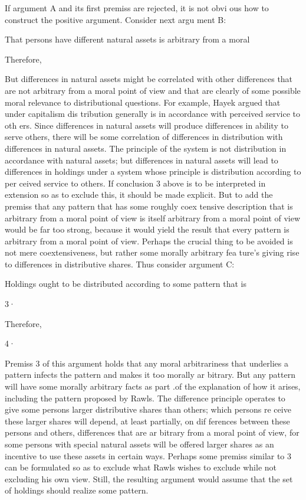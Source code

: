 \documentclass[11pt,openany]{book}
\begin{document}
If argument A and its first premiss are rejected, it is not obvi ous how to construct the positive argument. Consider next argu ment B: 

That persons have different natural assets is arbitrary from a moral 

Therefore, 

But differences in natural assets might be correlated with other differences that are not arbitrary from a moral point of view and that are clearly of some possible moral relevance to distributional questions. For example, Hayek argued that under capitalism dis tribution generally is in accordance with perceived service to oth ers. Since differences in natural assets will produce differences in ability to serve others, there will be some correlation of differences in distribution with differences in natural assets. The principle of the system is not distribution in accordance with natural assets; but differences in natural assets will lead to differences in holdings under a system whose principle is distribution according to per ceived service to others. If conclusion 3 above is to be interpreted in extension so as to exclude this, it should be made explicit. But to add the premiss that any pattern that has some roughly coex tensive description that is arbitrary from a moral point of view is itself arbitrary from a moral point of view would be far too strong, because it would yield the result that every pattern is arbitrary from a moral point of view. Perhaps the crucial thing to be avoided is not mere coextensiveness, but rather some morally arbitrary fea ture's giving rise to differences in distributive shares. Thus consider argument C: 

Holdings ought to be distributed according to some pattern that is 

3· 

Therefore, 

4· 

Premiss 3 of this argument holds that any moral arbitrariness that underlies a pattern infects the pattern and makes it too morally ar bitrary. But any pattern will have some morally arbitrary facts as part .of the explanation of how it arises, including the pattern proposed by Rawls. The difference principle operates to give some persons larger distributive shares than others; which persons re ceive these larger shares will depend, at least partially, on dif ferences between these persons and others, differences that are ar bitrary from a moral point of view, for some persons with special natural assets will be offered larger shares as an incentive to use these assets in certain ways. Perhaps some premiss similar to 3 can be formulated so as to exclude what Rawls wishes to exclude while not excluding his own view. Still, the resulting argument would assume that the set of holdings should realize some pattern. 
\end{document}
